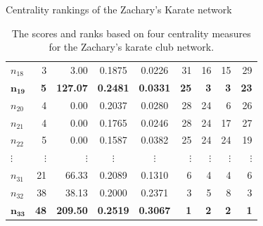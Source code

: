 \documentclass{beamer}
\begin{document}
\begin{frame}{Centrality rankings of the Zachary's Karate network}
\begin{table}[!h]
{\begin{tabular}{|l| r r c c| r r r r|}
				$n_{18}$ & 3 & 3.00 &  0.1875 & 0.0226  & 31 & 16 & 15 & 29\\ 
				$\mathbf{n_{19}}$ & \textbf{5} & \textbf{127.07} &  \textbf{0.2481} & \textbf{0.0331} & \textbf{25} & \textbf{3} & \textbf{3} & \textbf{23}\\ 
				$n_{20}$ & 4 & 0.00 &  0.2037 & 0.0280  & 28 & 24 & 6 & 26\\ 
				$n_{21}$ & 4 & 0.00 &  0.1765 & 0.0246  & 28 & 24 & 17 & 27\\ 
				$n_{22}$ & 5 & 0.00 & 0.1587 & 0.0382  & 25 & 24 & 24 & 19\\ 
				$\vdots$ & $\vdots$ & $\vdots$ & $\vdots$ & $\vdots$  & $\vdots$ & $\vdots$ & $\vdots$ & $\vdots$\\ 
				$n_{31}$ & 21 & 66.33 & 0.2089 & 0.1310 & 6 & 4 & 4 & 6\\ 
				$n_{32}$ & 38 & 38.13 & 0.2000 & 0.2371 & 3 & 5 & 8 & 3 \\ 
				$\mathbf{n_{33}}$& \textbf{48} & \textbf{209.50} &  \textbf{0.2519} &\textbf{ 0.3067} & \textbf{1} & \textbf{2} & \textbf{2} & \textbf{1} \\
				\hline
			\end{tabular} 
		}
	\caption{The scores and ranks based on four centrality measures for the Zachary's karate club network.}
		\label{tab:zach}
	\end{table}
\end{frame}
\end{document}

